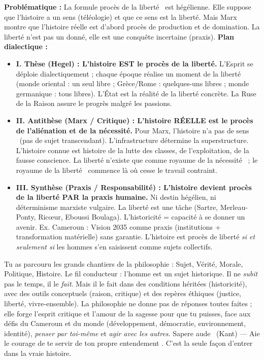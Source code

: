 \documentclass[11pt]{article}
\newcommand{\cle}[1]{{\popxbold\color{popdark}#1}}
\begin{document}
\begin{corrige}
\textbf{Problématique :} La formule \guillemotleft procès de la liberté \guillemotright\ est hégélienne. Elle suppose que l'histoire a un sens (téléologie) et que ce sens est la liberté. Mais Marx montre que l'histoire réelle est d'abord procès de production et de domination. La liberté n'est pas un donné, elle est une conquête incertaine (praxis).
\textbf{Plan dialectique :}
\begin{itemize}
\item \textbf{I. Thèse (Hegel) : L'histoire EST le procès de la liberté.} L'Esprit se déploie dialectiquement ; chaque époque réalise un moment de la liberté (monde oriental : un seul libre ; Grèce/Rome : quelques-uns libres ; monde germanique : tous libres). L'État est la réalité de la liberté concrète. La Ruse de la Raison assure le progrès malgré les passions.
\item \textbf{II. Antithèse (Marx / Critique) : L'histoire RÉELLE est le procès de l'aliénation et de la nécessité.} Pour Marx, \guillemotleft l'histoire n'a pas de sens \guillemotright\ (pas de sujet transcendant). L'infrastructure détermine la superstructure. L'histoire connue est histoire de la lutte des classes, de l'exploitation, de la fausse conscience. La liberté n'existe que comme \guillemotleft royaume de la nécessité \guillemotright\ ; le \guillemotleft royaume de la liberté \guillemotright\ commence là où cesse le travail contraint.
\item \textbf{III. Synthèse (Praxis / Responsabilité) : L'histoire devient procès de la liberté PAR la praxis humaine.} Ni destin hégélien, ni déterminisme marxiste vulgaire. La liberté est une \cle{tâche} (Sartre, Merleau-Ponty, Ricœur, Eboussi Boulaga). L'historicité = capacité à se donner un avenir. Ex. Cameroun : Vision 2035 comme praxis (institutions + transformation matérielle) sans garantie. L'histoire est procès de liberté \emph{si et seulement si} les hommes s'en saisissent comme sujets collectifs.
\end{itemize}
\end{corrige}

\begin{aretenir}
Tu as parcouru les grands chantiers de la philosophie : Sujet, Vérité, Morale, Politique, Histoire. Le fil conducteur : l'homme est un \cle{sujet historique}. Il ne \emph{subit} pas le temps, il le \emph{fait}. Mais il le fait dans des conditions héritées (historicité), avec des outils conceptuels (raison, critique) et des repères éthiques (justice, liberté, vivre-ensemble). La philosophie ne donne pas de réponses toutes faites ; elle forge l'\cle{esprit critique} et l'\cle{amour de la sagesse} pour que tu puisses, face aux défis du Cameroun et du monde (développement, démocratie, environnement, identité), \emph{penser par toi-même} et \emph{agir avec les autres}. \guillemotleft Sapere aude \guillemotright\ (Kant) — \guillemotleft Aie le courage de te servir de ton propre entendement \guillemotright. C'est la seule façon d'entrer dans la \cle{vraie histoire}.
\end{aretenir}
\end{document}
